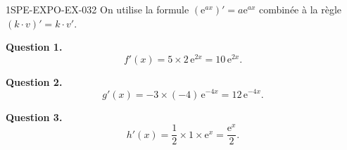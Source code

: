 \begin{corrige}{1SPE-EXPO-EX-032}
On utilise la formule $(\mathrm{e}^{ax})'=a\mathrm{e}^{ax}$ combinée à la règle $(k \cdot v)' = k \cdot v'$.

\textbf{Question 1.}
\[f'(x) = 5 \times 2\,\mathrm{e}^{2x} = \boxed{10\,\mathrm{e}^{2x}}.\]

\textbf{Question 2.}
\[g'(x) = -3 \times (-4)\,\mathrm{e}^{-4x} = \boxed{12\,\mathrm{e}^{-4x}}.\]

\textbf{Question 3.}
\[h'(x) = \frac{1}{2} \times 1 \times \mathrm{e}^{x} = \boxed{\frac{\mathrm{e}^{x}}{2}}.\]
\end{corrige}
